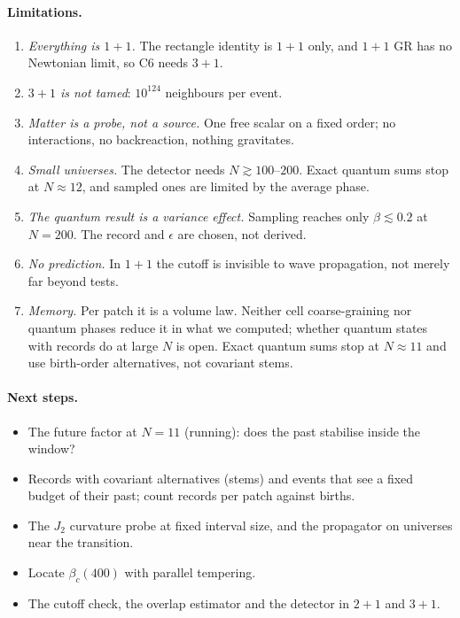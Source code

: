 \documentclass[11pt,a4paper]{article}
\begin{document}
\paragraph{Limitations.}
\begin{enumerate}[leftmargin=*,itemsep=1pt]
\item \emph{Everything is $1+1$.} The rectangle identity is $1+1$ only, and $1+1$ GR has no Newtonian limit, so C6 needs $3+1$.
\item \emph{$3+1$ is not tamed}: $10^{124}$ neighbours per event.
\item \emph{Matter is a probe, not a source.} One free scalar on a fixed order; no interactions, no backreaction, nothing gravitates.
\item \emph{Small universes.} The detector needs $N\gtrsim100$--$200$. Exact quantum sums stop at $N\approx12$, and sampled ones are limited by the average phase.
\item \emph{The quantum result is a variance effect.} Sampling reaches only $\beta\lesssim0.2$ at $N=200$. The record and $\epsilon$ are chosen, not derived.
\item \emph{No prediction.} In $1+1$ the cutoff is invisible to wave propagation, not merely far beyond tests.
\item \emph{Memory.} Per patch it is a volume law. Neither cell coarse-graining nor quantum phases reduce it in what we computed; whether quantum states with records do at large $N$ is open. Exact quantum sums stop at $N\approx11$ and use birth-order alternatives, not covariant stems.
\end{enumerate}

\paragraph{Next steps.}
\begin{itemize}[leftmargin=*,itemsep=1pt]
\item The future factor at $N=11$ (running): does the past stabilise inside the window?
\item Records with covariant alternatives (stems) and events that see a fixed budget of their past; count records per patch against births.
\item The $J_2$ curvature probe at fixed interval size, and the propagator on universes near the transition.
\item Locate $\beta_c(400)$ with parallel tempering.
\item The cutoff check, the overlap estimator and the detector in $2+1$ and $3+1$.
\end{itemize}
\end{document}
